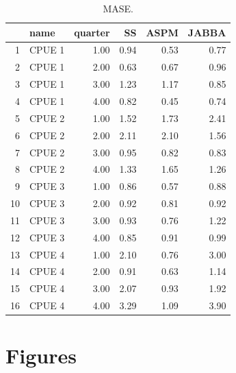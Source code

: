 \documentclass[a4paper]{article}
\begin{document}
\begin{table}[ht]
\caption{MASE.}  
\label{tab:mase}
\centering
\begin{tabular}{rlrrrr}
  \hline
 & name & quarter & SS & ASPM & JABBA \\ 
  \hline
  1 & CPUE 1 & 1.00 & 0.94 & 0.53 & 0.77 \\ 
  2 & CPUE 1 & 2.00 & 0.63 & 0.67 & 0.96 \\ 
  3 & CPUE 1 & 3.00 & 1.23 & 1.17 & 0.85 \\ 
  4 & CPUE 1 & 4.00 & 0.82 & 0.45 & 0.74 \\ 
  5 & CPUE 2 & 1.00 & 1.52 & 1.73 & 2.41 \\ 
  6 & CPUE 2 & 2.00 & 2.11 & 2.10 & 1.56 \\ 
  7 & CPUE 2 & 3.00 & 0.95 & 0.82 & 0.83 \\ 
  8 & CPUE 2 & 4.00 & 1.33 & 1.65 & 1.26 \\ 
  9 & CPUE 3 & 1.00 & 0.86 & 0.57 & 0.88 \\ 
  10 & CPUE 3 & 2.00 & 0.92 & 0.81 & 0.92 \\ 
  11 & CPUE 3 & 3.00 & 0.93 & 0.76 & 1.22 \\ 
  12 & CPUE 3 & 4.00 & 0.85 & 0.91 & 0.99 \\ 
  13 & CPUE 4 & 1.00 & 2.10 & 0.76 & 3.00 \\ 
  14 & CPUE 4 & 2.00 & 0.91 & 0.63 & 1.14 \\ 
  15 & CPUE 4 & 3.00 & 2.07 & 0.93 & 1.92 \\ 
  16 & CPUE 4 & 4.00 & 3.29 & 1.09 & 3.90 \\ 
   \hline
\end{tabular}
\end{table}

\clearpage
\section{Figures}
\end{document}
